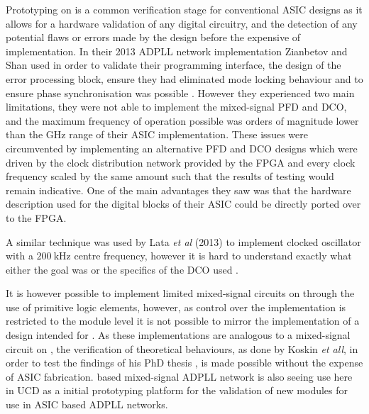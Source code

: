Prototyping on  is a common verification stage for conventional \ac{ASIC} designs as it allows for a hardware validation of any digital circuitry, and the detection of any potential flaws or errors made by the design before the expensive of  implementation. In their 2013 \ac{ADPLL} network implementation Zianbetov and Shan used  in order to validate their programming interface, the design of the error processing block, ensure they had eliminated mode locking behaviour and to ensure phase synchronisation was possible \cite{zianbetov2013phd,shan2014phd}. However they experienced two main limitations, they were not able to implement the mixed-signal \ac{PFD} and \ac{DCO}, and the maximum frequency of operation possible was orders of magnitude lower than the GHz range of their \ac{ASIC} implementation. These issues were circumvented by implementing an alternative \ac{PFD} and \ac{DCO} designs which were driven by the clock distribution network provided by the \ac{FPGA} and every clock frequency scaled by the same amount such that the results of testing would remain indicative. One of the main advantages they saw was that the hardware description used for the digital blocks of their \ac{ASIC} could be directly ported over to the \ac{FPGA}.

A similar technique was used by Lata \textit{et al} (2013) to implement  clocked oscillator with a $200~\si{\kilo\hertz}$ centre frequency, however it is hard to understand exactly what either the goal was or the specifics of the \ac{DCO} used \cite{lata2013adpll}.

It is however possible to implement limited mixed-signal circuits on  through the use of primitive logic elements, however, as control over the implementation is restricted to the module level it is not possible to mirror the implementation of a design intended for . As these implementations are analogous to a mixed-signal circuit on , the verification of theoretical behaviours, as done by Koskin \textit{et all}, in order to test the findings of his PhD thesis \cite{theboys2019}, is made possible without the expense of \ac{ASIC} fabrication.  based mixed-signal \ac{ADPLL} network is also seeing use here in \ac{UCD} as a initial prototyping platform for the validation of new modules for use in \ac{ASIC} based \ac{ADPLL} networks.

